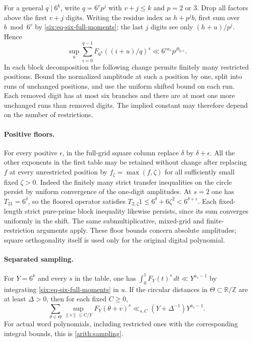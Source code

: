 \documentclass[11pt,a4paper]{article}
\theoremstyle{paperplain}
\numberwithin{equation}{section}
\begin{document}
For a general $q\mid 6^k$, write $q=6^v p^j$ with $v+j\le k$ and
$p=2$ or $3$. Drop all factors above the first $v+j$ digits.
Writing the residue index as $h+p^j b$, first sum over $b\bmod 6^v$
by \eqref{six:eq-six-full-moments}; the last $j$ digits see only
$(h+u)/p^j$. Hence
\begin{equation}
 \sup_u\sum_{i=0}^{q-1} F_{6^k}((i+u)/q)^s
    \ll 6^{v a_s}p^{j b_{p,s}}.\label{six:eq-six-mixed-moments}
\end{equation}
In each block decomposition the following change permits finitely
many restricted positions. Bound the normalized amplitude at such a
position by one, split into runs of unchanged positions, and use the
uniform shifted bound on each run. Each removed digit has at most
six branches and there are at most one more unchanged runs than
removed digits. The implied constant may therefore depend on the
number of restrictions.

\paragraph{Positive floors.}
For every positive $\epsilon$, in the full-grid square column replace
$\delta$ by $\delta+\epsilon$. All the other exponents in the first
table may be retained without change after replacing $f$ at every
unrestricted position by $f_\zeta=\max(f,\zeta)$ for all sufficiently
small fixed $\zeta>0$. Indeed the finitely many strict transfer
inequalities on the circle persist by uniform convergence of the
one-digit amplitudes. At $s=2$ one has $T_21=6^\delta$, so the
floored operator satisfies
$T_{2,\zeta}1\le 6^\delta+6\zeta^2<6^{\delta+\epsilon}$.
Each fixed-length strict pure-prime block inequality likewise
persists, since its sum converges uniformly in the shift. The same
submultiplicative, mixed-grid and finite-restriction arguments apply.
These floor bounds concern absolute amplitudes; square orthogonality
itself is used only for the original digital polynomial.

\paragraph{Separated sampling.}
For $Y=6^k$ and every $s$ in the table, one has
$\int_0^1 F_Y(t)^s\,dt\ll Y^{a_s-1}$ by integrating
\eqref{six:eq-six-full-moments} in $u$. If the circular distances in
$\Theta\subset\mathbb R/\mathbb Z$ are at least $\Delta>0$, then
for each fixed $C\ge0$,
\begin{equation}
 \sum_{\theta\in\Theta}\sup_{\|v\|\le C/Y} F_Y(\theta+v)^s
 \ll_{s,C}(Y+\Delta^{-1})Y^{a_s-1}.\label{six:eq-six-separated-sampling}
\end{equation}
For actual word polynomials, including restricted ones with the
corresponding integral bounds, this is \eqref{arith:sampling}.
\end{document}
